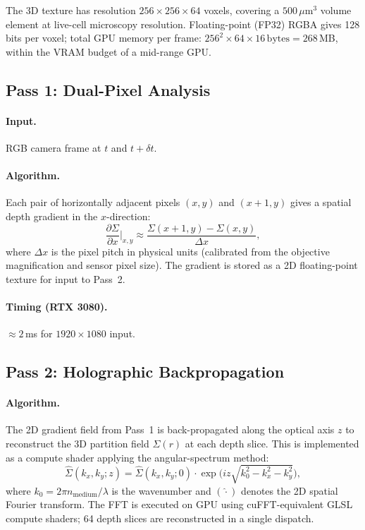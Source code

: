 The 3D texture has resolution $256 \times 256 \times 64$ voxels, covering a
$500\,\mu\mathrm{m}^3$ volume element at live-cell microscopy resolution.
Floating-point (FP32) RGBA gives 128 bits per voxel; total GPU memory per
frame: $256^2 \times 64 \times 16\,\mathrm{bytes} = 268$\,MB, within the
VRAM budget of a mid-range GPU.

\subsection{Pass 1: Dual-Pixel Analysis}
\label{subsec:ch09-gpu-pass1}

\paragraph{Input.} RGB camera frame at $t$ and $t + \delta t$.

\paragraph{Algorithm.} Each pair of horizontally adjacent pixels
$(x, y)$ and $(x+1, y)$ gives a spatial depth gradient in the $x$-direction:
\begin{equation}
  \frac{\partial\Sigma}{\partial x}\bigg|_{x,y}
  \approx \frac{\Sigma(x+1,y) - \Sigma(x,y)}{\Delta x},
  \label{eq:ch09-gpu-grad}
\end{equation}
where $\Delta x$ is the pixel pitch in physical units (calibrated from the
objective magnification and sensor pixel size).  The gradient is stored as a
2D floating-point texture for input to Pass~2.

\paragraph{Timing (RTX 3080).} $\approx 2$\,ms for $1920\times1080$ input.

\subsection{Pass 2: Holographic Backpropagation}
\label{subsec:ch09-gpu-pass2}

\paragraph{Algorithm.} The 2D gradient field from Pass~1 is back-propagated
along the optical axis $z$ to reconstruct the 3D partition field $\Sigma(r)$
at each depth slice.  This is implemented as a compute shader applying the
angular-spectrum method:
\begin{equation}
  \hat{\Sigma}(k_x, k_y; z)
  = \hat{\Sigma}(k_x, k_y; 0)\cdot
    \exp\!\bigl(iz\sqrt{k_0^2 - k_x^2 - k_y^2}\bigr),
  \label{eq:ch09-gpu-backprop}
\end{equation}
where $k_0 = 2\pi n_{\mathrm{medium}}/\lambda$ is the wavenumber and
$(\hat{\cdot})$ denotes the 2D spatial Fourier transform.  The FFT is
executed on GPU using cuFFT-equivalent GLSL compute shaders; 64 depth slices
are reconstructed in a single dispatch.

